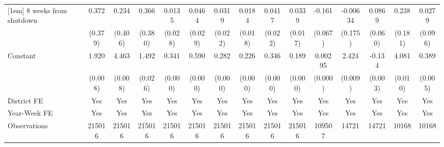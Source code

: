 \begin{table}[htbp]
\begin{tabular}{l*{14}{c}}
[1em]
8 weeks from shutdown&       0.372         &       0.234         &       0.366         &      0.0135         &      0.0464         &      0.0319         &      0.0184         &      0.0417\sym{*}  &      0.0339\sym{**} &      -0.161\sym{**} &    -0.00634         &      0.0869         &       0.238         &      0.0279         \\
                    &     (0.379)         &     (0.406)         &     (0.380)         &     (0.028)         &     (0.029)         &     (0.022)         &     (0.018)         &     (0.022)         &     (0.017)         &     (0.067)         &     (0.175)         &     (0.060)         &     (0.181)         &     (0.096)         \\
[1em]
Constant            &       1.920\sym{***}&       4.463\sym{***}&       1.492\sym{***}&       0.341\sym{***}&       0.590\sym{***}&       0.282\sym{***}&       0.226\sym{***}&       0.346\sym{***}&       0.189\sym{***}&     0.00295\sym{***}&       2.424\sym{***}&      -0.134\sym{***}&       4.081\sym{***}&       0.389\sym{***}\\
                    &     (0.008)         &     (0.008)         &     (0.026)         &     (0.000)         &     (0.000)         &     (0.000)         &     (0.000)         &     (0.000)         &     (0.000)         &     (0.000)         &     (0.009)         &     (0.003)         &     (0.010)         &     (0.005)         \\
\hline
District FE         &         Yes         &         Yes         &         Yes         &         Yes         &         Yes         &         Yes         &         Yes         &         Yes         &         Yes         &         Yes         &         Yes         &         Yes         &         Yes         &         Yes         \\
Year-Week FE        &         Yes         &         Yes         &         Yes         &         Yes         &         Yes         &         Yes         &         Yes         &         Yes         &         Yes         &         Yes         &         Yes         &         Yes         &         Yes         &         Yes         \\
Observations        &      215016         &      215016         &      215016         &      215016         &      215016         &      215016         &      215016         &      215016         &      215016         &      109507         &       14721         &       14721         &       10168         &       10168         \\

\end{tabular}
\end{table}

